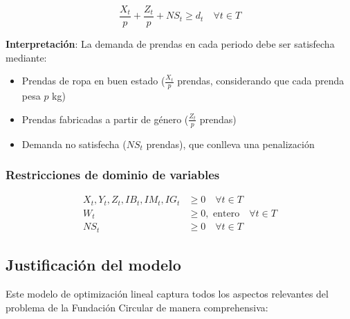 \begin{equation}
\frac{X_t}{p} + \frac{Z_t}{p} + NS_t \geq d_t \quad \forall t \in T
\end{equation}

\textbf{Interpretación}: La demanda de prendas en cada periodo debe ser satisfecha mediante:
\begin{itemize}
    \item Prendas de ropa en buen estado ($\frac{X_t}{p}$ prendas, considerando que cada prenda pesa $p$ kg)
    \item Prendas fabricadas a partir de género ($\frac{Z_t}{p}$ prendas)
    \item Demanda no satisfecha ($NS_t$ prendas), que conlleva una penalización
\end{itemize}

\subsubsection*{Restricciones de dominio de variables}

\begin{align}
X_t, Y_t, Z_t, IB_t, IM_t, IG_t &\geq 0 \quad \forall t \in T\\
W_t &\geq 0, \text{ entero} \quad \forall t \in T\\
NS_t &\geq 0 \quad \forall t \in T
\end{align}

\subsection*{Justificación del modelo}

Este modelo de optimización lineal captura todos los aspectos relevantes del problema de la Fundación Circular de manera comprehensiva:

